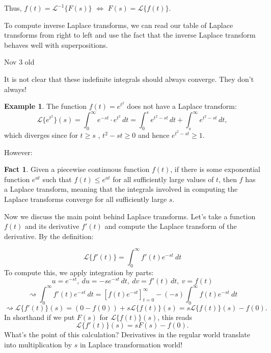 \documentclass[12pt]{amsart}
\numberwithin{equation}{section}
\theoremstyle{plain} %
\newcommand{\Nov}[1]{Nov #1 old}
\newcommand{\rsa}{\rightsquigarrow}
\theoremstyle{definition}
\newtheorem{ex}[equation]{Example}
\newtheorem{fact}[equation]{Fact}
\theoremstyle{remark}
\newcommand{\LA}[1]{\mathcal{L}\{ #1 \}}
\newcommand{\LAi}[1]{\mathcal{L}^{-1}\{ #1 \}}
\begin{document}
Thus, $f(t) = \LAi{F(s)}$ $\Leftrightarrow$ $F(s) = \LA{f(t)}$.

To compute inverse Laplace transforms, we can read our table of Laplace transforms from right to left and use the fact that the inverse Laplace transform behaves well with superpositions.



\Nov{3}



It is not clear that these indefinite integrals should always converge. They don't always!
\begin{ex}
The function $f(t)= e^{t^2}$ does not have a Laplace transform:
\[ \LA{e^{t^2}}(s) =  \int_0^\infty e^{-st} \cdot e^{t^2} \, dt = \int_0^s e^{t^2-st}  \, dt + \int_s^\infty e^{t^2-st}  \, dt,\]
which diverges since for $t\geq s$ , $t^2-st\geq 0$ and hence $e^{t^2-st}\geq 1$.
\end{ex}

 However:
\begin{fact}
Given a piecewise continuous function $f(t)$, if there is some exponential function $e^{at}$ such that $f(t)\leq e^{at}$ for all sufficiently large values of $t$, then $f$ has a Laplace transform, meaning that the integrals involved in computing the Laplace transforms converge for all sufficiently large $s$.
\end{fact}



Now we discuss the main point behind Laplace transforms. Let's take a function $f(t)$ and its derivative $f'(t)$ and compute the Laplace transform of the derivative. By the definition:

\[ \LA{f'(t)} = \int_{0}^\infty f'(t) e^{-st} \ dt\]
To compute this, we apply integration by parts: 
\[u=e^{-st}, \ du = -s e^{-st} \, dt,  \ dv = f'(t) \, dt,  \ v=f(t)\]
\[ \rsa \int_{0}^\infty f'(t) e^{-st} \ dt = \left[ f(t) e^{-st} \right]_{t=0}^\infty - (-s) \int_{0}^\infty f(t) e^{-st} \ dt\]
\[ \rsa \LA{f'(t)}(s) = (0 - f(0))  + s \LA{f(t)}(s) = s \LA{f(t)}(s) - f(0).\]
In shorthand if we put $F(s)$ for $\LA{f(t)}(s)$, this reads
\[  \LA{f'(t)}(s) = s F(s) - f(0).\]
What's the point of this calculation? Derivatives in the regular world translate into multiplication by $s$ in Laplace transformation world!
\end{document}
